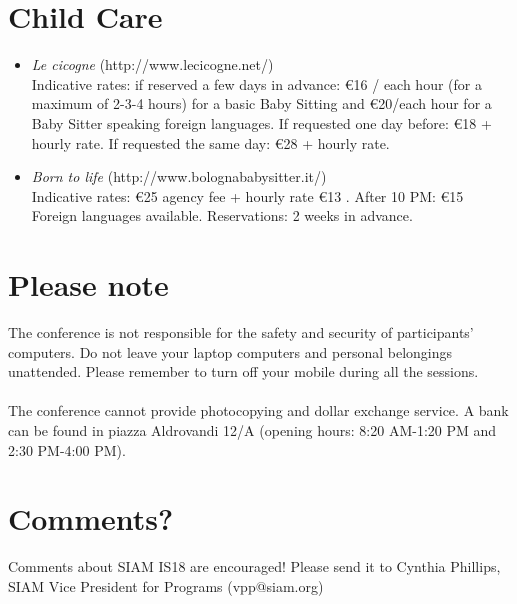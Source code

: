 \section*{Child Care}
\begin{itemize}
\item \emph{Le cicogne} (http://www.lecicogne.net/)\\
Indicative rates: if reserved a few days in advance: \euro 16 / each hour (for a maximum of 2-3-4 hours) for a basic Baby Sitting and \euro 20/each hour for a Baby Sitter speaking foreign languages.
If requested one day before: \euro 18 + hourly rate.
If requested the same day: \euro 28 + hourly rate.
\item \emph{Born to life} (http://www.bolognababysitter.it/)\\
Indicative rates: \euro 25 agency fee + hourly rate \euro 13 . After 10 PM: \euro 15 Foreign languages available. Reservations: 2 weeks in advance.
\end{itemize}
\section*{Please note}
The conference is not responsible for the safety and security of participants' computers. Do not leave your laptop computers and personal belongings unattended. Please remember to turn off your mobile during all the sessions.\\\\ The conference cannot provide photocopying and dollar exchange service. A bank can be found in piazza Aldrovandi 12/A (opening hours: 8:20 AM-1:20 PM and 2:30 PM-4:00 PM).
\section*{Comments?}
Comments about SIAM IS18 are encouraged! Please send it to Cynthia Phillips, SIAM Vice President for Programs (vpp@siam.org)
